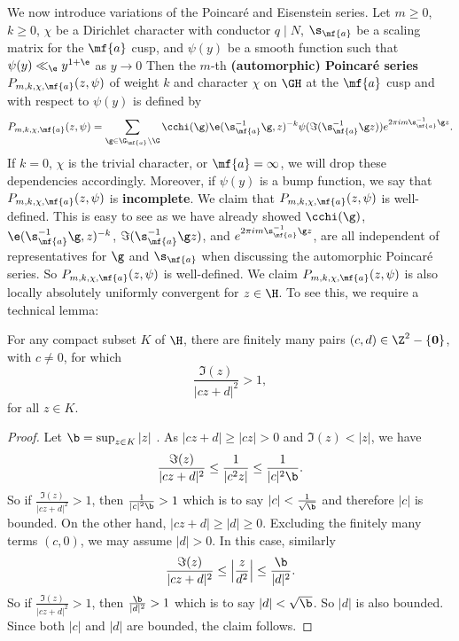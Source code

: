     We now introduce variations of the Poincar\'e and Eisenstein series. Let $m \ge 0$, $k \ge 0$, $\chi$ be a Dirichlet character with conductor $q \mid N$, $\s_{\mf{a}}$ be a scaling matrix for the $\mf{a}$ cusp, and $\psi(y)$ be a smooth function such that $\psi(y) \ll_{\e} y^{1+\e}$ as $y \to 0$ Then the $m$-th \textbf{(automorphic) Poincar\'e series} $P_{m,k,\chi,\mf{a}}(z,\psi)$ of weight $k$ and character $\chi$ on $\GH$ at the $\mf{a}$ cusp and with respect to $\psi(y)$ is defined by
    \[
      P_{m,k,\chi,\mf{a}}(z,\psi) = \sum_{\g \in \G_{\mf{a}}\backslash\G}\cchi(\g)\e(\s_{\mf{a}}^{-1}\g,z)^{-k}\psi(\Im(\s_{\mf{a}}^{-1}\g z))e^{2\pi im\s_{\mf{a}}^{-1}\g z}.
    \]
    If $k = 0$, $\chi$ is the trivial character, or $\mf{a} = \infty$, we will drop these dependencies accordingly. Moreover, if $\psi(y)$ is a bump function, we say that $P_{m,k,\chi,\mf{a}}(z,\psi)$ is \textbf{incomplete}. We claim that $P_{m,k,\chi,\mf{a}}(z,\psi)$ is well-defined. This is easy to see as we have already showed $\cchi(\g)$, $\e(\s_{\mf{a}}^{-1}\g,z)^{-k}$, $\Im(\s_{\mf{a}}^{-1}\g z)$, and $e^{2\pi im\s_{\mf{a}}^{-1}\g z}$, are all independent of representatives for $\g$ and $\s_{\mf{a}}$ when discussing the automorphic Poincar\'e series. So $P_{m,k,\chi,\mf{a}}(z,\psi)$ is well-defined. We claim $P_{m,k,\chi,\mf{a}}(z,\psi)$ is also locally absolutely uniformly convergent for $z \in \H$. To see this, we require a technical lemma:

    \begin{lemma}\label{lem:finitely_many_pairs_with_size_larger_than_one}
      For any compact subset $K$ of $\H$, there are finitely many pairs $(c,d) \in \Z^{2}-\{\mathbf{0}\}$, with $c \neq 0$, for which
      \[
        \frac{\Im(z)}{|cz+d|^{2}} > 1,
      \]
      for all $z \in K$.
      \end{lemma}
      \begin{proof}
      Let $\b = \sup_{z \in K}|z|$ . As $|cz+d| \ge |cz| > 0$ and $\Im(z) < |z|$, we have
      \[
        \frac{\Im(z)}{|cz+d|^{2}} \le \frac{1}{|c^{2}z|} \le \frac{1}{|c|^{2}\b}.
      \]
      So if $\frac{\Im(z)}{|cz+d|^{2}} > 1$, then $\frac{1}{|c|^{2}\b} > 1$ which is to say $|c| < \frac{1}{\sqrt{\b}}$ and therefore $|c|$ is bounded. On the other hand, $|cz+d| \ge |d| \ge 0$. Excluding the finitely many terms $(c,0)$, we may assume $|d| > 0$. In this case, similarly  
      \[
        \frac{\Im(z)}{|cz+d|^{2}} \le \left|\frac{z}{d^{2}}\right| \le \frac{\b}{|d|^{2}}.
      \]
      So if $\frac{\Im(z)}{|cz+d|^{2}} > 1$, then $\frac{\b}{|d|^{2}}> 1$ which is to say $|d| < \sqrt{\b}$. So $|d|$ is also bounded. Since both $|c|$ and $|d|$ are bounded, the claim follows.
    \end{proof}

